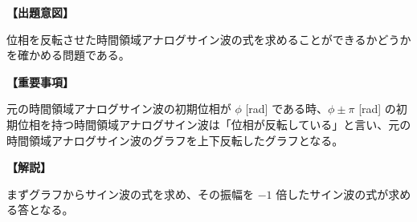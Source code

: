 \noindent \textbf{【出題意図】}

\noindent 位相を反転させた時間領域アナログサイン波の式を求めることができるかどうかを確かめる問題である。

\vspace{1em}
\noindent \textbf{【重要事項】}

\bigskip
元の時間領域アナログサイン波の初期位相が $\phi$ [rad] である時、$\phi \pm \pi$ [rad] の初期位相を持つ時間領域アナログサイン波は「位相が反転している」と言い、元の時間領域アナログサイン波のグラフを上下反転したグラフとなる。

\vspace{1em}
\noindent \textbf{【解説】}

\noindent まずグラフからサイン波の式を求め、その振幅を $-1$ 倍したサイン波の式が求める答となる。
